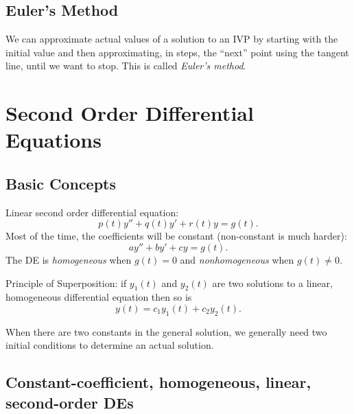 \documentclass[12pt]{article}
\theoremstyle{definition}
\begin{document}
\subsection{Euler's Method}

We can approximate actual values of a solution to an IVP by starting with the initial value and then approximating, in steps, the ``next'' point using the tangent line, until we want to stop. This is called \textit{Euler's method}.

\section{Second Order Differential Equations}

\subsection{Basic Concepts}
Linear second order differential equation: \begin{equation*}
	p(t)y'' + q(t)y' + r(t)y = g(t).
\end{equation*}
Most of the time, the coefficients will be constant (non-constant is much harder): \begin{equation*}
	ay'' + by' + cy = g(t).
\end{equation*}
The DE is \textit{homogeneous} when $g(t) = 0$ and \textit{nonhomogeneous} when $g(t) \neq 0$.

Principle of Superposition: if $y_1(t)$ and $y_2(t)$ are two solutions to a linear, homogeneous differential equation then so is \begin{equation*}
	y(t) = c_1y_1(t) + c_2y_2(t).
\end{equation*}

When there are two constants in the general solution, we generally need two initial conditions to determine an actual solution.

\subsection{Constant-coefficient, homogeneous, linear, second-order DEs}
\end{document}
